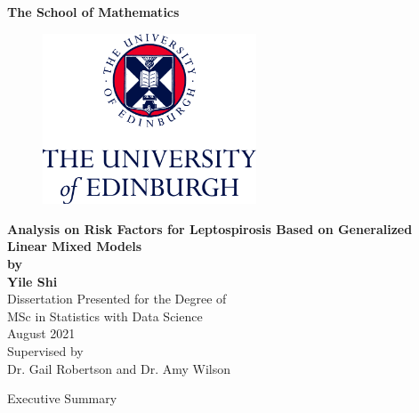 \documentclass[11pt,twoside]{article}
\numberwithin{Theorem}{section}
\numberwithin{Definition}{section}
\numberwithin{Lemma}{section}
\numberwithin{Algorithm}{section}
\numberwithin{equation}{section}
\begin{document}
	
\pagestyle{empty}

\begin{titlepage}
\vspace*{.5em}
\centering
\textbf{\Large{The School of Mathematics}} \\
\vspace*{1em}
\begin{figure}[!h]
\centering
\includegraphics[width=180pt]{CentredLogoCMYK.jpg}
\end{figure}
\vspace{2em}
\textbf{\Huge{Analysis on Risk Factors for Leptospirosis Based on Generalized Linear Mixed Models}}\\[2em]
\textbf{\LARGE{by}}\\
\vspace{2em}
\textbf{\LARGE{Yile Shi}}\\
\vspace{6.5em}
\Large{Dissertation Presented for the Degree of\\
MSc in Statistics with Data Science}\\
\vspace{6.5em}
\Large{August 2021}\\
\vspace{3em}
\Large{Supervised by\\Dr. Gail Robertson and Dr. Amy Wilson}
\vfill
\end{titlepage}

\clearpage

\begin{center}
\Large{Executive Summary}
\end{center}
\end{document}
